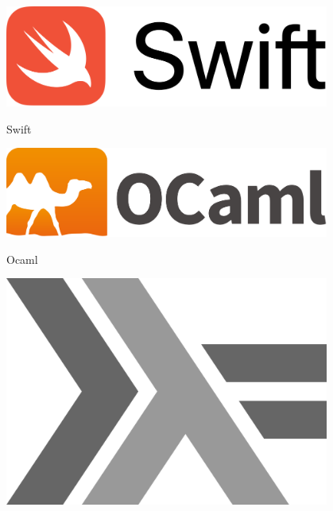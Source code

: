 \documentclass[NET,english,aspectratio=169,notitleframe,draft]{tumbeamer}
\begin{document}

\begin{frame}{}
\centering\includegraphics[width=0.8\textwidth]{pics/swift}
\end{frame}

\begin{frame}{Swift}
\end{frame}



\begin{frame}{}
\centering\includegraphics[width=0.8\textwidth]{pics/ocaml}
\end{frame}

\begin{frame}{Ocaml}
\end{frame}


\begin{frame}{}
\centering\includegraphics[width=0.8\textwidth]{pics/haskell}
\end{frame}
\end{document}
